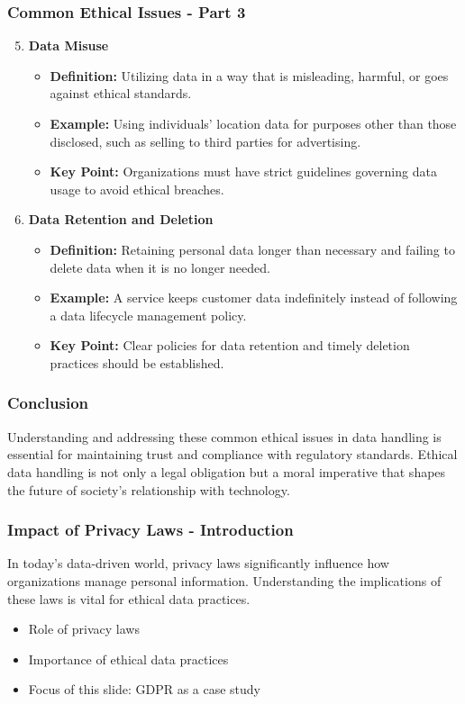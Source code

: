 \documentclass[aspectratio=169]{beamer}
\begin{document}
\begin{frame}[fragile]
    \frametitle{Common Ethical Issues - Part 3}
    \begin{enumerate}
        \setcounter{enumi}{4}
        \item \textbf{Data Misuse}
            \begin{itemize}
                \item \textbf{Definition:} Utilizing data in a way that is misleading, harmful, or goes against ethical standards.
                \item \textbf{Example:} Using individuals' location data for purposes other than those disclosed, such as selling to third parties for advertising.
                \item \textbf{Key Point:} Organizations must have strict guidelines governing data usage to avoid ethical breaches.
            \end{itemize}
        
        \item \textbf{Data Retention and Deletion}
            \begin{itemize}
                \item \textbf{Definition:} Retaining personal data longer than necessary and failing to delete data when it is no longer needed.
                \item \textbf{Example:} A service keeps customer data indefinitely instead of following a data lifecycle management policy.
                \item \textbf{Key Point:} Clear policies for data retention and timely deletion practices should be established.
            \end{itemize}
    \end{enumerate}
\end{frame}

\begin{frame}[fragile]
    \frametitle{Conclusion}
    Understanding and addressing these common ethical issues in data handling is essential for maintaining trust and compliance with regulatory standards. Ethical data handling is not only a legal obligation but a moral imperative that shapes the future of society’s relationship with technology.
\end{frame}

\begin{frame}[fragile]
    \frametitle{Impact of Privacy Laws - Introduction}
    In today's data-driven world, privacy laws significantly influence how organizations manage personal information. Understanding the implications of these laws is vital for ethical data practices. 
    \begin{itemize}
        \item Role of privacy laws 
        \item Importance of ethical data practices
        \item Focus of this slide: GDPR as a case study
    \end{itemize}
\end{frame}
\end{document}
